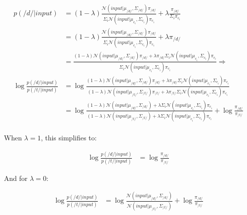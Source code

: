 \documentclass[
  11pt,
  man,floatsintext]{apa6}
\begin{document}
\begin{equation}\label{eq:change-bias}
\begin{split}
p(/d/ | input) & = (1-\lambda) \frac{\mathcal{N}\!\left( input | \mu_{/d/}, \Sigma_{/d/} \right) \pi_{/d/}}{\Sigma_i \mathcal{N}\!\left( input | \mu_{c_i}, \Sigma_{c_i}\right) \pi_{c_i}} + \lambda \frac{\pi_{/d/}}{\Sigma_i \pi_{c_i}} \\
 & = (1-\lambda) \frac{\mathcal{N}\!\left( input | \mu_{/d/}, \Sigma_{/d/} \right) \pi_{/d/}}{\Sigma_i \mathcal{N}\!\left( input | \mu_{c_i}, \Sigma_{c_i}\right) \pi_{c_i}} + \lambda \pi_{/d/} \\
 & = \frac{(1-\lambda) \mathcal{N}\!\left( input | \mu_{/d/}, \Sigma_{/d/} \right) \pi_{/d/} + \lambda \pi_{/d/} \Sigma_i \mathcal{N}\!\left( input | \mu_{c_i}, \Sigma_{c_i}\right) \pi_{c_i}}{\Sigma_i \mathcal{N}\!\left( input | \mu_{c_i}, \Sigma_{c_i}\right) \pi_{c_i}} \Rightarrow \\
\log \frac{p(/d/ | input)}{p(/t/ | input)}  & = \log \frac{(1-\lambda) \mathcal{N}\!\left( input | \mu_{/d/}, \Sigma_{/d/} \right) \pi_{/d/} + \lambda \pi_{/d/} \Sigma_i \mathcal{N}\!\left( input | \mu_{c_i}, \Sigma_{c_i}\right) \pi_{c_i}}{(1-\lambda) \mathcal{N}\!\left( input | \mu_{/t/}, \Sigma_{/t/} \right) \pi_{/t/} + \lambda \pi_{/t/} \Sigma_i \mathcal{N}\!\left( input | \mu_{c_i}, \Sigma_{c_i}\right) \pi_{c_i}} \\
 & = \log \frac{(1-\lambda) \mathcal{N}\!\left( input | \mu_{/d/}, \Sigma_{/d/} \right) + \lambda \Sigma_i \mathcal{N}\!\left( input | \mu_{c_i}, \Sigma_{c_i}\right) \pi_{c_i}}{(1-\lambda) \mathcal{N}\!\left( input | \mu_{/t/}, \Sigma_{/t/} \right)  + \lambda  \Sigma_i \mathcal{N}\!\left( input | \mu_{c_i}, \Sigma_{c_i}\right) \pi_{c_i}} + \log\frac{\pi_{/d/}}{\pi_{/t/}} \\
\end{split}
\end{equation}

When \(\lambda=1\), this simplifies to:

\begin{equation}
\begin{split}
\log \frac{p(/d/ | input)}{p(/t/ | input)} & = \log\frac{\pi_{/d/}}{\pi_{/t/}}
\end{split}
\end{equation}

And for \(\lambda=0\):

\begin{equation}
\begin{split}
\log \frac{p(/d/ | input)}{p(/t/ | input)} & = \log \frac{\mathcal{N}\!\left( input | \mu_{/d/}, \Sigma_{/d/} \right)}{\mathcal{N}\!\left( input | \mu_{/t/}, \Sigma_{/t/} \right)} + \log\frac{\pi_{/d/}}{\pi_{/t/}} 
\end{split}
\end{equation}
\end{document}
